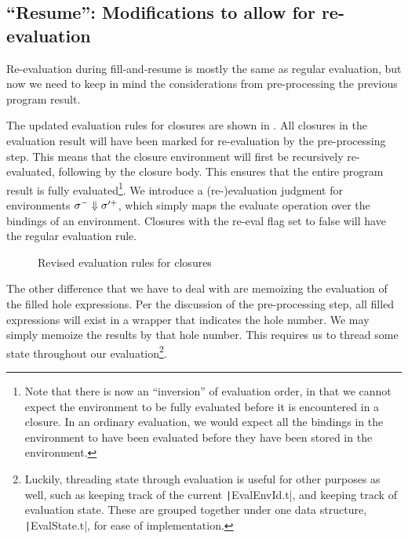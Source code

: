 \subsection{``Resume'': Modifications to allow for re-evaluation}
\label{sec:re-eval}

Re-evaluation during fill-and-resume is mostly the same as regular evaluation, but now we need to keep in mind the considerations from pre-processing the previous program result.

The updated evaluation rules for closures are shown in . All closures in the evaluation result will have been marked for re-evaluation by the pre-processing step. This means that the closure environment will first be recursively re-evaluated, following by the closure body. This ensures that the entire program result is fully evaluated\footnote{Note that there is now an ``inversion'' of evaluation order, in that we cannot expect the environment to be fully evaluated before it is encountered in a closure. In an ordinary evaluation, we would expect all the bindings in the environment to have been evaluated before they have been stored in the environment.}. We introduce a (re-)evaluation judgment for environments $\sigma^-\Downarrow\sigma'^+$, which simply maps the evaluate operation over the bindings of an environment. Closures with the re-eval flag set to false will have the regular evaluation rule.


\begin{figure}
  \centering
  \begin{mdframed}
    \begin{singlespace}
      
    \end{singlespace}
  \end{mdframed}
  \caption{Revised evaluation rules for closures}
  \label{fig:reeval-closures}
\end{figure}

The other difference that we have to deal with are memoizing the evaluation of the filled hole expressions. Per the discussion of the pre-processing step, all filled expressions will exist in a wrapper that indicates the hole number. We may simply memoize the results by that hole number. This requires us to thread some state throughout our evaluation\footnote{Luckily, threading state through evaluation is useful for other purposes as well, such as keeping track of the current \texttt|EvalEnvId.t|, and keeping track of evaluation state. These are grouped together under one data structure, \texttt|EvalState.t|, for ease of implementation.}.

